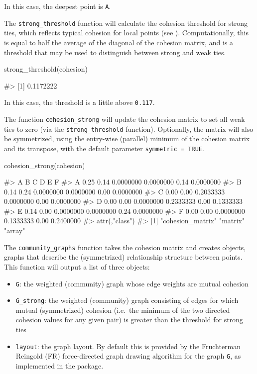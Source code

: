 In this case, the deepest point is \texttt{A}.

The \texttt{strong\_threshold} function will calculate the cohesion
threshold for strong ties, which reflects typical cohesion for local
points (see \citet{berenhaut2022social}). Computationally, this is equal
to half the average of the diagonal of the cohesion matrix, and is a
threshold that may be used to distinguish between strong and weak ties.

\begin{Schunk}
\begin{Sinput}
strong_threshold(cohesion)
\end{Sinput}
\begin{Soutput}
#> [1] 0.1172222
\end{Soutput}
\end{Schunk}

In this case, the threshold is a little above \texttt{0.117}.

The function \texttt{cohesion\_strong} will update the cohesion matrix
to set all weak ties to zero (via the \texttt{strong\_threshold}
function). Optionally, the matrix will also be symmetrized, using the
entry-wise (parallel) minimum of the cohesion matrix and its transpose,
with the default parameter \texttt{symmetric\ =\ TRUE}.

\begin{Schunk}
\begin{Sinput}
cohesion_strong(cohesion)
\end{Sinput}
\begin{Soutput}
#>      A    B         C         D    E         F
#> A 0.25 0.14 0.0000000 0.0000000 0.14 0.0000000
#> B 0.14 0.24 0.0000000 0.0000000 0.00 0.0000000
#> C 0.00 0.00 0.2033333 0.0000000 0.00 0.0000000
#> D 0.00 0.00 0.0000000 0.2333333 0.00 0.1333333
#> E 0.14 0.00 0.0000000 0.0000000 0.24 0.0000000
#> F 0.00 0.00 0.0000000 0.1333333 0.00 0.2400000
#> attr(,"class")
#> [1] "cohesion_matrix" "matrix"          "array"
\end{Soutput}
\end{Schunk}

The \texttt{community\_graphs} function takes the cohesion matrix and
creates  objects, graphs that describe the (symmetrized)
relationship structure between points. This function will output a list
of three objects:

\begin{itemize}
\tightlist
\item
  \texttt{G}: the weighted (community) graph whose edge weights are
  mutual cohesion
\item
  \texttt{G\_strong}: the weighted (community) graph consisting of edges
  for which mutual (symmetrized) cohesion (i.e.~the minimum of the two
  directed cohesion values for any given pair) is greater than the
  threshold for strong ties
\item
  \texttt{layout}: the graph layout. By default this is provided by the
  Fruchterman Reingold (FR) force-directed graph drawing algorithm for
  the graph \texttt{G}, as implemented in the  package.
\end{itemize}

